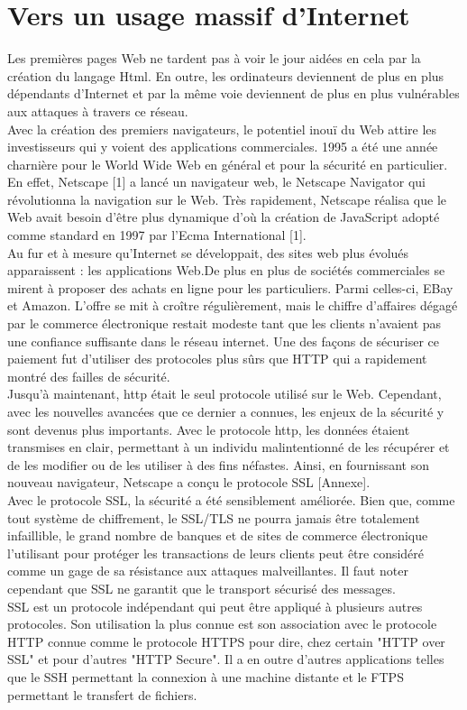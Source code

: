 \section{Vers un usage massif d'Internet}
Les premières pages Web ne tardent pas à voir le jour aidées en cela par la création du langage Html. En outre, les ordinateurs deviennent de plus en plus dépendants d’Internet et par la même voie deviennent de plus en plus vulnérables aux attaques à travers ce réseau.\\
Avec la création des premiers navigateurs, le potentiel inouï du Web attire les investisseurs qui y voient des applications commerciales. 1995 a été une année charnière pour le World Wide Web en général et pour la sécurité en particulier. En effet, Netscape [1] a lancé un navigateur web, le Netscape Navigator qui révolutionna la navigation sur le Web. Très rapidement, Netscape réalisa que le Web avait besoin d’être plus dynamique d’où la création de JavaScript adopté comme standard en 1997 par l’Ecma International [1]. \\
Au fur et à mesure qu'Internet se développait, des sites web plus évolués apparaissent : les applications Web.De plus en plus de sociétés commerciales se mirent à proposer des achats en ligne pour les particuliers. Parmi celles-ci, EBay et Amazon. L'offre se mit à croître régulièrement, mais le chiffre d'affaires dégagé par le commerce électronique restait modeste tant que les clients n'avaient pas une confiance suffisante dans le réseau internet. Une des façons de sécuriser ce paiement fut d'utiliser des protocoles plus sûrs que HTTP qui a rapidement montré des failles de sécurité.\\
Jusqu’à maintenant, http était le seul protocole utilisé sur le Web. Cependant, avec les  nouvelles avancées que ce dernier a connues, les enjeux de la sécurité y sont devenus plus importants. Avec le protocole http, les données étaient transmises en clair, permettant à un individu malintentionné de les récupérer et de les modifier ou de les utiliser à des fins néfastes. Ainsi, en fournissant son nouveau navigateur, Netscape a conçu le protocole SSL [Annexe].\\
Avec le protocole SSL, la sécurité a été sensiblement améliorée. Bien que, comme tout système de chiffrement, le SSL/TLS ne pourra jamais être totalement infaillible, le grand nombre de banques et de sites de commerce électronique l'utilisant pour protéger les transactions de leurs clients peut être considéré comme un gage de sa résistance aux attaques malveillantes. Il faut noter cependant que SSL ne garantit que le transport sécurisé des messages.\\
SSL est un protocole indépendant qui peut être appliqué à plusieurs autres protocoles. Son utilisation la plus connue est son association avec le protocole HTTP connue comme le protocole HTTPS pour dire, chez certain "HTTP over SSL" et pour d’autres "HTTP Secure". Il a en outre d’autres applications telles que le SSH permettant la connexion à une machine distante et le FTPS permettant le transfert de fichiers.


\clearpage 
